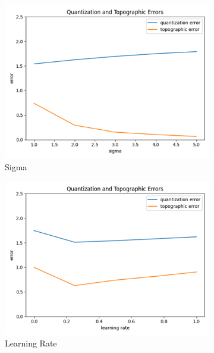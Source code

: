 \begin{figure}
     \centering
     \begin{subfigure}[b]{0.3\textwidth}
         \centering
         \includegraphics[width=\textwidth]{figures/SOM_sigmas.png}
         \caption{Sigma}
         \label{fig:sig}
     \end{subfigure}
     \hfill
     \begin{subfigure}[b]{0.3\textwidth}
         \centering
         \includegraphics[width=\textwidth]{figures/SOM_learningrates.png}
         \caption{Learning Rate}
         \label{fig:lr}
     \end{subfigure}
     \hfill
     \begin{subfigure}[b]{0.3\textwidth}

\end{subfigure}
\end{figure}
